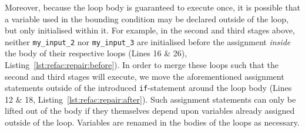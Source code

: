 %
%
Moreover, because the loop body is guaranteed to execute once, it is possible that a variable used in the bounding condition may be declared outside of the loop, but only initialised within it. For example, in the second and third stages above, neither \lstinline|my_input_2| nor \lstinline|my_input_3| are initialised before the assignment \emph{inside} the body of their respective loops (Lines 16 \& 26), Listing~\ref{lst:refac:repair:before}). In order to merge these loops such that the second and third stages will execute, we move the aforementioned assignment statements outside of the introduced \lstinline{if}-statement around the loop body (Lines 12 \& 18, Listing~\ref{lst:refac:repair:after}). Such assignment statements can only be lifted out of the body if they themselves depend upon variables already assigned outside of the loop.
%
%
%
%
Variables are renamed in the bodies of the loops as necessary.
%




